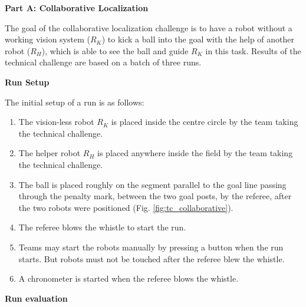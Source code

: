 \clearpage
\sffamily
{\bfseries\color[rgb]{0.4,0.4,0.4} Part A: Collaborative Localization
  }
{}


\bigskip

The goal of the collaborative localization challenge is to have a  robot without a working vision system ($R_K$) to kick a ball
into the goal with the help of another robot ($R_H$), which is able to see the ball and guide $R_K$ in this task. Results of the technical challenge are based on a batch of three runs.

\bigskip

{\bfseries Run Setup}

\smallskip


The initial setup of a run is as follows:

\begin{enumerate}

\item The vision-less robot $R_K$ is placed inside the centre circle by the team taking the technical challenge.

\item The helper robot $R_H$ is placed anywhere inside the field by the team taking the technical challenge.

\item The ball is placed roughly on the segment parallel to the goal line passing through the penalty mark, between the two goal posts, by the referee, after the two robots were positioned (Fig. \ref{fig:tc_collaborative}).

\item The referee blows the whistle to start the run.

\item Teams may start the robots manually by pressing a button when the run starts. But robots must not be touched after the referee blew the whistle. 

\item A chronometer is started when the referee blows the whistle.
\end{enumerate}

{\bfseries Run evaluation}

\smallskip

